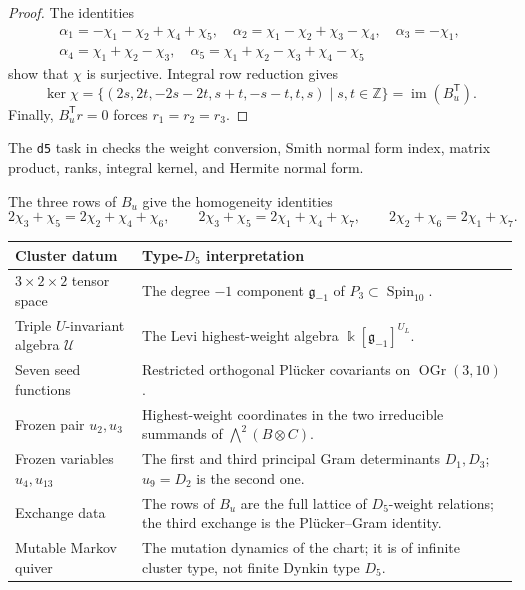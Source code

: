 \documentclass[11pt,reqno]{amsart}
\numberwithin{equation}{section}
\theoremstyle{remark}
\newcommand{\kk}{\Bbbk}
\newcommand{\ZZ}{\mathbb{Z}}
\newcommand{\UR}{\mathscr U}
\begin{document}
\begin{proof}
The identities
\[
\begin{gathered}
 \alpha_1=-\chi_1-\chi_2+\chi_4+\chi_5,\quad
 \alpha_2=\chi_1-\chi_2+\chi_3-\chi_4,\quad
 \alpha_3=-\chi_1,\\
 \alpha_4=\chi_1+\chi_2-\chi_3,\quad
 \alpha_5=\chi_1+\chi_2-\chi_3+\chi_4-\chi_5
\end{gathered}
\]
show that $\chi$ is surjective.  Integral row reduction gives
\[ \ker\chi= \{(2s,2t,-2s-2t,s+t,-s-t,t,s)\mid s,t\in\ZZ\} =\operatorname{im}(B_u^{\mathsf T}). \]
Finally, $B_u^{\mathsf T}r=0$ forces $r_1=r_2=r_3$.
\end{proof}
The \texttt{d5} task in  checks the
weight conversion, Smith normal form index, matrix product, ranks, integral kernel, and
Hermite normal form.

The three rows of $B_u$ give the homogeneity identities
\[ 2\chi_3+\chi_5=2\chi_2+\chi_4+\chi_6,\qquad 2\chi_3+\chi_5=2\chi_1+\chi_4+\chi_7, \qquad 2\chi_2+\chi_6=2\chi_1+\chi_7. \]

\begin{center}
\scriptsize
\renewcommand{\arraystretch}{1.08}
\begin{tabular}{@{}>{\raggedright\arraybackslash}p{}
                    >{\raggedright\arraybackslash}p{}@{}}
\toprule
\textbf{Cluster datum}&\textbf{Type-$D_5$ interpretation}\\
\midrule
$3\times2\times2$ tensor space
& The degree $-1$ component $\mathfrak g_{-1}$ of
  $P_3\subset\operatorname{Spin}_{10}$.\\
Triple $U$-invariant algebra $\UR$
& The Levi highest-weight algebra $\kk[\mathfrak g_{-1}]^{U_L}$.\\
Seven seed functions
& Restricted orthogonal Pl\"ucker covariants on
  $\operatorname{OGr}(3,10)$.\\
Frozen pair $u_2,u_3$
& Highest-weight coordinates in the two irreducible summands of
  $\bigwedge^2(B\otimes C)$.\\
Frozen variables $u_4,u_{13}$
& The first and third principal Gram determinants $D_1,D_3$;
  $u_9=D_2$ is the second one.\\
Exchange data
& The rows of $B_u$ are the full lattice of $D_5$-weight relations;
  the third exchange is the Pl\"ucker--Gram identity.\\
Mutable Markov quiver
& The mutation dynamics of the chart; it is of infinite cluster type, not
  finite Dynkin type $D_5$.\\
\bottomrule
\end{tabular}
\end{center}
\end{document}
